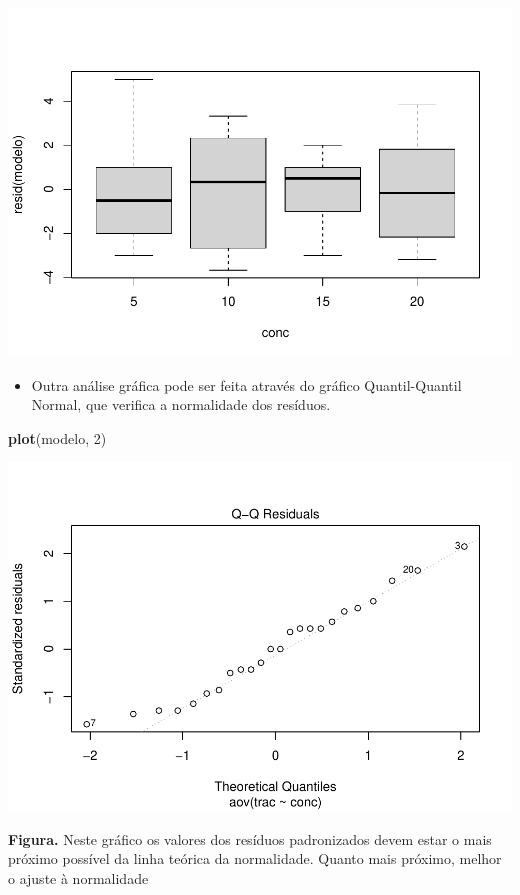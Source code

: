 \documentclass[
]{book}
\newenvironment{Shaded}{\begin{snugshade}}{\end{snugshade}}
\newcommand{\DecValTok}[1]{\textcolor[rgb]{0.00,0.00,0.81}{#1}}
\newcommand{\FunctionTok}[1]{\textcolor[rgb]{0.13,0.29,0.53}{\textbf{#1}}}
\newcommand{\NormalTok}[1]{#1}
\providecommand{\tightlist}{%
  \setlength{\itemsep}{0pt}\setlength{\parskip}{0pt}}
\begin{document}
\includegraphics{_main_files/figure-latex/boxplot-1.pdf}

\begin{itemize}
\tightlist
\item
  Outra análise gráfica pode ser feita através do gráfico Quantil-Quantil Normal, que verifica a normalidade dos resíduos.
\end{itemize}

\begin{Shaded}
\begin{Highlighting}[]
\FunctionTok{plot}\NormalTok{(modelo, }\DecValTok{2}\NormalTok{)}
\end{Highlighting}
\end{Shaded}

\includegraphics{_main_files/figure-latex/qq-1.pdf}

\textbf{Figura.} Neste gráfico os valores dos resíduos padronizados devem estar o mais próximo possível da linha teórica da normalidade. Quanto mais próximo, melhor o ajuste à normalidade
\end{document}
